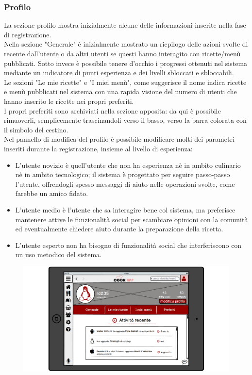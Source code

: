 \begin{itemize}
\subsubsection{Profilo}
La sezione profilo mostra inizialmente alcune delle informazioni inserite nella fase di registrazione.\\
Nella sezione "Generale" è inizialmente mostrato un riepilogo delle azioni svolte di recente dall'utente o da altri utenti se questi hanno interagito con ricette/menù pubblicati. Sotto invece è possibile tenere d'occhio i progressi ottenuti nel sistema mediante un indicatore di punti esperienza e dei livelli sbloccati e sbloccabili.\\
Le sezioni "Le mie ricette" e "I miei menù", come suggerisce il nome indica ricette e menù pubblicati nel sistema con una rapida visione del numero di utenti che hanno inserito le ricette nei propri preferiti.\\
I propri preferiti sono archiviati nella sezione apposita: da qui è possibile rimuoverli, semplicemente trascinandoli verso il basso, verso la barra colorata con il simbolo del cestino.\\
Nel pannello di modifica del profilo è possibile modificare molti dei parametri inseriti durante la registrazione, insieme al livello di esperienza:
\begin{itemize}
\item L'utente novizio è quell'utente che non ha esperienza nè in ambito culinario nè in ambito tecnologico; il sistema è progettato per seguire passo-passo l'utente, offrendogli spesso messaggi di aiuto nelle operazioni svolte, come farebbe un amico fidato.
\item L'utente medio è l'utente che sa interagire bene col sistema, ma preferisce mantenere attive le funzionalità social per scambiare opinioni con la comunità ed eventualmente chiedere aiuto durante la preparazione della ricetta.
\item L'utente esperto non ha bisogno di funzionalità social che interferiscono con un uso metodico del sistema. 
\end{itemize}
\begin{figure}[H]
	\centering
	\includegraphics[width=0.95\linewidth]{img/mockup/Profilo-generale.png}

\end{figure}
\end{itemize}
